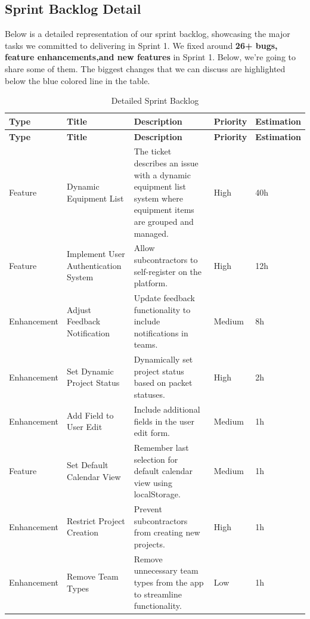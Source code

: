 \subsection{Sprint Backlog Detail}
Below is a detailed representation of our sprint backlog, showcasing the major tasks we committed to delivering in Sprint 1. We fixed around \textbf{26+ bugs, feature enhancements,and new features }in Sprint 1. Below, we're going to share some of them. The biggest changes that we can discuss are highlighted below the blue colored line in the table.
\begin{longtable}{ | m{} | m{} | m{} | m{} | m{} | }
    \caption{Detailed Sprint Backlog} \\
    \hline
    \textbf{Type} & \textbf{Title} & \textbf{Description} & \textbf{Priority} & \textbf{Estimation} \\
    \hline
    \endfirsthead
    \hline
    \textbf{Type} & \textbf{Title} & \textbf{Description} & \textbf{Priority} & \textbf{Estimation} \\
    \hline
    \endhead
    \hline
    \endfoot
    \endlastfoot
    \rowcolor{blue!20} 
    Feature & Dynamic Equipment List & The ticket describes an issue with a dynamic equipment list system where equipment items are grouped and managed. & High & 40h \\
    \hline
    \rowcolor{blue!20} Feature & Implement User Authentication System & Allow subcontractors to self-register on the platform. & High & 12h \\
    \hline
    \rowcolor{blue!20} 
    Enhancement & Adjust Feedback Notification & Update feedback functionality to include notifications in teams. & Medium & 8h \\
    \hline
    Enhancement & Set Dynamic Project Status & Dynamically set project status based on packet statuses. & High & 2h \\
    \hline
    Enhancement & Add Field to User Edit & Include additional fields in the user edit form. & Medium & 1h \\
    \hline
    Feature & Set Default Calendar View & Remember last selection for default calendar view using localStorage. & Medium & 1h \\
    \hline
    Enhancement & Restrict Project Creation & Prevent subcontractors from creating new projects. & High & 1h \\
    \hline
    Enhancement & Remove Team Types & Remove unnecessary team types from the app to streamline functionality. & Low & 1h \\

\end{longtable}
